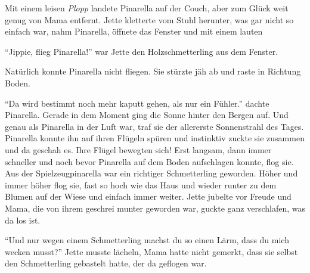 Mit einem leisen {\it Plopp} landete Pinarella auf der Couch, aber zum Glück weit genug von Mama entfernt. Jette kletterte vom Stuhl herunter, was gar nicht so einfach war, nahm Pinarella, öffnete das Fenster und mit einem lauten 

\enquote{Jippie, flieg Pinarella!} war Jette den Holzschmetterling aus dem Fenster.

Natürlich konnte Pinarella nicht fliegen. Sie stürzte jäh ab und raste in Richtung Boden. 

\enquote{Da wird bestimmt noch mehr kaputt gehen, als nur ein Fühler.} dachte Pinarella. Gerade in dem Moment ging die Sonne hinter den Bergen auf. Und genau als Pinarella in der Luft war, traf sie der allererste Sonnenstrahl des Tages. Pinarella konnte ihn auf ihren Flügeln spüren und instinktiv zuckte sie zusammen und da geschah es. Ihre Flügel bewegten sich! Erst langsam, dann immer schneller und noch bevor Pinarella auf dem Boden aufschlagen konnte, flog sie. Aus der Spielzeugpinarella war ein richtiger Schmetterling geworden. Höher und immer höher flog sie, fast so hoch wie das Haus und wieder runter zu dem Blumen auf der Wiese und einfach immer weiter. Jette jubelte vor Freude und Mama, die von ihrem geschrei munter geworden war, guckte ganz verschlafen, was da los ist.

\enquote{Und nur wegen einem Schmetterling machst du so einen Lärm, dass du mich wecken musst?} Jette musste lächeln, Mama hatte nicht gemerkt, dass sie selbst den Schmetterling gebastelt hatte, der da geflogen war. \hfill {\color{red}\decofourleft}
